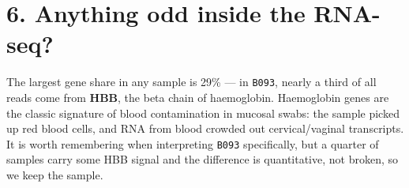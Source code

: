 \documentclass[
  letterpaper,
  DIV=11,
  numbers=noendperiod]{scrartcl}
\newenvironment{Shaded}{\begin{snugshade}}{\end{snugshade}}
\newcommand{\AttributeTok}[1]{\textcolor[rgb]{0.40,0.45,0.13}{#1}}
\newcommand{\CommentTok}[1]{\textcolor[rgb]{0.37,0.37,0.37}{#1}}
\newcommand{\ConstantTok}[1]{\textcolor[rgb]{0.56,0.35,0.01}{#1}}
\newcommand{\FunctionTok}[1]{\textcolor[rgb]{0.28,0.35,0.67}{#1}}
\newcommand{\NormalTok}[1]{\textcolor[rgb]{0.00,0.23,0.31}{#1}}
\newcommand{\OtherTok}[1]{\textcolor[rgb]{0.00,0.23,0.31}{#1}}
\newcommand{\SpecialCharTok}[1]{\textcolor[rgb]{0.37,0.37,0.37}{#1}}
\newcommand{\StringTok}[1]{\textcolor[rgb]{0.13,0.47,0.30}{#1}}
\begin{document}
\section{6. Anything odd inside the
RNA-seq?}\label{anything-odd-inside-the-rna-seq}

The largest gene share in any sample is 29\% --- in \texttt{B093},
nearly a third of all reads come from \textbf{HBB}, the beta chain of
haemoglobin. Haemoglobin genes are the classic signature of blood
contamination in mucosal swabs: the sample picked up red blood cells,
and RNA from blood crowded out cervical/vaginal transcripts. It is worth
remembering when interpreting \texttt{B093} specifically, but a quarter
of samples carry some HBB signal and the difference is quantitative, not
broken, so we keep the sample.

\begin{Shaded}
\end{Shaded}
\end{document}
